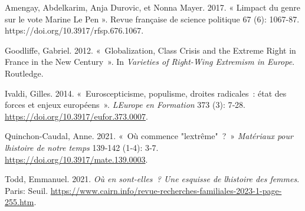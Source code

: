 \documentclass[
  letterpaper,
  DIV=11,
  numbers=noendperiod]{scrartcl}
\begin{document}
Amengay, Abdelkarim, Anja Durovic, et Nonna Mayer. 2017. «
L\textquotesingle impact du genre sur le vote Marine Le Pen ». Revue
française de science politique 67 (6): 1067-87.
https://doi.org/10.3917/rfsp.676.1067.

Goodliffe, Gabriel. 2012. «~Globalization, Class Crisis and the Extreme
Right in France in the New Century~». In \emph{Varieties of Right-Wing
Extremism in Europe}. Routledge.

Ivaldi, Gilles. 2014. «~Euroscepticisme, populisme, droites radicales~:
état des forces et enjeux européens~». \emph{L\textquotesingle Europe en
Formation} 373 (3): 7‑28. \url{https://doi.org/10.3917/eufor.373.0007}.

Quinchon-Caudal, Anne. 2021. «~Où commence
"l\textquotesingle extrême"~?~» \emph{Matériaux pour
l\textquotesingle histoire de notre temps} 139‑142 (1‑4): 3‑7.
\url{https://doi.org/10.3917/mate.139.0003}.

Todd, Emmanuel. 2021. \emph{Où en sont-elles~? Une esquisse de
l\textquotesingle histoire des femmes}. Paris: Seuil.
\url{https://www.cairn.info/revue-recherches-familiales-2023-1-page-255.htm}.
\end{document}
